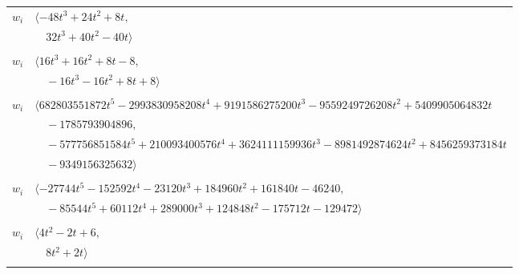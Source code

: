 \documentclass[11pt]{article}
\begin{document}
\begin{longtable}{@{}ll@{}}
$w_i$ & $\langle -48t^{3}+24t^{2}+8t,$\\
 & $\quad 32t^{3}+40t^{2}-40t\rangle$\\
\addlinespace[2pt]
\multicolumn{2}{@{}p{0.97\textwidth}@{}}{$i=19$, $D_i=2$, $e_i=2$, $\rho_{ij}$: $3{:}3, \allowbreak 9{:}1, \allowbreak 20{:}1, \allowbreak 26{:}3, \allowbreak 30{:}3$}\\
$w_i$ & $\langle 16t^{3}+16t^{2}+8t-8,$\\
 & $\quad -16t^{3}-16t^{2}+8t+8\rangle$\\
\addlinespace[2pt]
\multicolumn{2}{@{}p{0.97\textwidth}@{}}{$i=20$, $D_i=1641354692$, $e_i=0$, $\rho_{ij}$: $2{:}2, \allowbreak 5{:}1, \allowbreak 7{:}1, \allowbreak 13{:}3, \allowbreak 18{:}2, \allowbreak 19{:}3, \allowbreak 21{:}2, \allowbreak 24{:}1, \allowbreak 25{:}2, \allowbreak 26{:}2, \allowbreak 31{:}2, \allowbreak 33{:}1, \allowbreak 37{:}2, \allowbreak 39{:}3, \allowbreak 40{:}1, \allowbreak 41{:}3$}\\
$w_i$ & $\langle 682803551872t^{5}-2993830958208t^{4}+9191586275200t^{3}-9559249726208t^{2}+5409905064832t$\\
 & $\quad -1785793904896,$\\
 & $\quad -577756851584t^{5}+210093400576t^{4}+3624111159936t^{3}-8981492874624t^{2}+8456259373184t$\\
 & $\quad -9349156325632\rangle$\\
\addlinespace[2pt]
\multicolumn{2}{@{}p{0.97\textwidth}@{}}{$i=21$, $D_i=9826$, $e_i=0$, $\rho_{ij}$: $1{:}1, \allowbreak 8{:}3, \allowbreak 9{:}1, \allowbreak 20{:}2, \allowbreak 23{:}3, \allowbreak 25{:}2, \allowbreak 26{:}2, \allowbreak 30{:}1, \allowbreak 31{:}2, \allowbreak 32{:}1$}\\
$w_i$ & $\langle -27744t^{5}-152592t^{4}-23120t^{3}+184960t^{2}+161840t-46240,$\\
 & $\quad -85544t^{5}+60112t^{4}+289000t^{3}+124848t^{2}-175712t-129472\rangle$\\
\addlinespace[2pt]
\multicolumn{2}{@{}p{0.97\textwidth}@{}}{$i=22$, $D_i=2$, $\rho_{ij}$: $1{:}3, \allowbreak 2{:}3, \allowbreak 4{:}2, \allowbreak 9{:}3, \allowbreak 12{:}2, \allowbreak 33{:}1, \allowbreak 41{:}3$}\\
$w_i$ & $\langle 4t^{2}-2t+6,$\\
 & $\quad 8t^{2}+2t\rangle$\\
\addlinespace[2pt]
\multicolumn{2}{@{}p{0.97\textwidth}@{}}{$i=23$, $D_i=1$, $\rho_{ij}$: $3{:}3, \allowbreak 6{:}2, \allowbreak 9{:}3, \allowbreak 11{:}1, \allowbreak 13{:}3, \allowbreak 16{:}3, \allowbreak 21{:}1, \allowbreak 33{:}1, \allowbreak 35{:}2$}\\

\end{longtable}
\end{document}
